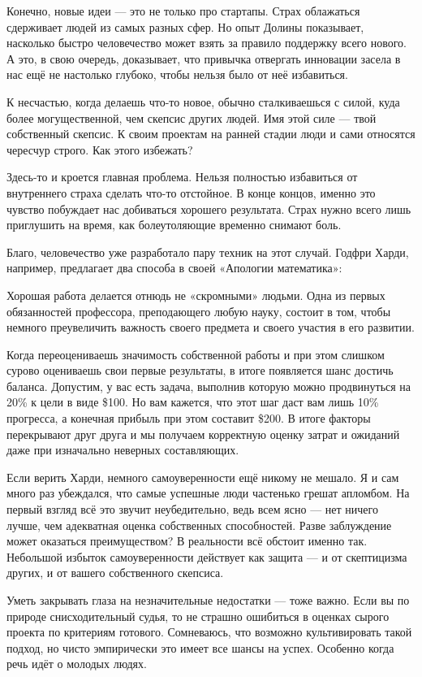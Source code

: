 \documentclass[ebook,12pt,oneside,openany]{memoir}
\begin{document}
Конечно, новые идеи — это не только про стартапы. Страх облажаться
сдерживает людей из самых разных сфер. Но опыт Долины показывает,
насколько быстро человечество может взять за правило поддержку всего
нового. А это, в свою очередь, доказывает, что привычка отвергать
инновации засела в нас ещё не настолько глубоко, чтобы нельзя было от
неё избавиться.


К несчастью, когда делаешь что-то новое, обычно сталкиваешься с силой,
куда более могущественной, чем скепсис других людей. Имя этой силе —
твой собственный скепсис. К своим проектам на ранней стадии люди и
сами относятся чересчур строго. Как этого избежать?

Здесь-то и кроется главная проблема. Нельзя полностью избавиться от
внутреннего страха сделать что-то отстойное. В конце концов, именно
это чувство побуждает нас добиваться хорошего результата. Страх нужно
всего лишь приглушить на время, как болеутоляющие временно снимают
боль.

Благо, человечество уже разработало пару техник на этот случай. Годфри
Харди, например, предлагает два способа в своей «Апологии математика»:



Хорошая работа делается отнюдь не «скромными» людьми. Одна из первых
обязанностей профессора, преподающего любую науку, состоит в том,
чтобы немного преувеличить важность своего предмета и своего участия в
его развитии.

Когда переоцениваешь значимость собственной работы и при этом слишком
сурово оцениваешь свои первые результаты, в итоге появляется шанс
достичь баланса. Допустим, у вас есть задача, выполнив которую можно
продвинуться на 20\% к цели в виде \$100. Но вам кажется, что этот шаг
даст вам лишь 10\% прогресса, а конечная прибыль при этом составит
\$200. В итоге факторы перекрывают друг друга и мы получаем корректную
оценку затрат и ожиданий даже при изначально неверных составляющих.

Если верить Харди, немного самоуверенности ещё никому не мешало. Я и
сам много раз убеждался, что самые успешные люди частенько грешат
апломбом. На первый взгляд всё это звучит неубедительно, ведь всем
ясно — нет ничего лучше, чем адекватная оценка собственных
способностей. Разве заблуждение может оказаться преимуществом? В
реальности всё обстоит именно так. Небольшой избыток самоуверенности
действует как защита — и от скептицизма других, и от вашего
собственного скепсиса.

Уметь закрывать глаза на незначительные недостатки — тоже важно. Если
вы по природе снисходительный судья, то не страшно ошибиться в оценках
сырого проекта по критериям готового. Сомневаюсь, что возможно
культивировать такой подход, но чисто эмпирически это имеет все шансы
на успех. Особенно когда речь идёт о молодых людях.
\end{document}
